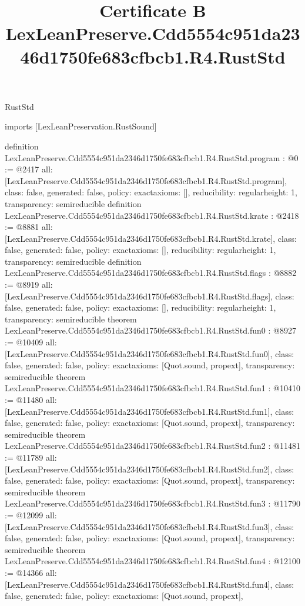 \begin{lexlean}{RustStd}
\title{Certificate B LexLeanPreserve.Cdd5554c951da2346d1750fe683cfbcb1.R4.RustStd}
\begin{coremodule}
imports [LexLeanPreservation.RustSound]

definition LexLeanPreserve.Cdd5554c951da2346d1750fe683cfbcb1.R4.RustStd.program : @0 := @2417 {
  all: [LexLeanPreserve.Cdd5554c951da2346d1750fe683cfbcb1.R4.RustStd.program],
  class: false,
  generated: false,
  policy: exact{axioms: []},
  reducibility: regular{height: 1},
  transparency: semireducible
}
definition LexLeanPreserve.Cdd5554c951da2346d1750fe683cfbcb1.R4.RustStd.krate : @2418 := @8881 {
  all: [LexLeanPreserve.Cdd5554c951da2346d1750fe683cfbcb1.R4.RustStd.krate],
  class: false,
  generated: false,
  policy: exact{axioms: []},
  reducibility: regular{height: 1},
  transparency: semireducible
}
definition LexLeanPreserve.Cdd5554c951da2346d1750fe683cfbcb1.R4.RustStd.flags : @8882 := @8919 {
  all: [LexLeanPreserve.Cdd5554c951da2346d1750fe683cfbcb1.R4.RustStd.flags],
  class: false,
  generated: false,
  policy: exact{axioms: []},
  reducibility: regular{height: 1},
  transparency: semireducible
}
theorem LexLeanPreserve.Cdd5554c951da2346d1750fe683cfbcb1.R4.RustStd.fun0 : @8927 := @10409 {
  all: [LexLeanPreserve.Cdd5554c951da2346d1750fe683cfbcb1.R4.RustStd.fun0],
  class: false,
  generated: false,
  policy: exact{axioms: [Quot.sound, propext]},
  transparency: semireducible
}
theorem LexLeanPreserve.Cdd5554c951da2346d1750fe683cfbcb1.R4.RustStd.fun1 : @10410 := @11480 {
  all: [LexLeanPreserve.Cdd5554c951da2346d1750fe683cfbcb1.R4.RustStd.fun1],
  class: false,
  generated: false,
  policy: exact{axioms: [Quot.sound, propext]},
  transparency: semireducible
}
theorem LexLeanPreserve.Cdd5554c951da2346d1750fe683cfbcb1.R4.RustStd.fun2 : @11481 := @11789 {
  all: [LexLeanPreserve.Cdd5554c951da2346d1750fe683cfbcb1.R4.RustStd.fun2],
  class: false,
  generated: false,
  policy: exact{axioms: [Quot.sound, propext]},
  transparency: semireducible
}
theorem LexLeanPreserve.Cdd5554c951da2346d1750fe683cfbcb1.R4.RustStd.fun3 : @11790 := @12099 {
  all: [LexLeanPreserve.Cdd5554c951da2346d1750fe683cfbcb1.R4.RustStd.fun3],
  class: false,
  generated: false,
  policy: exact{axioms: [Quot.sound, propext]},
  transparency: semireducible
}
theorem LexLeanPreserve.Cdd5554c951da2346d1750fe683cfbcb1.R4.RustStd.fun4 : @12100 := @14366 {
  all: [LexLeanPreserve.Cdd5554c951da2346d1750fe683cfbcb1.R4.RustStd.fun4],
  class: false,
  generated: false,
  policy: exact{axioms: [Quot.sound, propext]},
}
\end{coremodule}
\end{lexlean}
